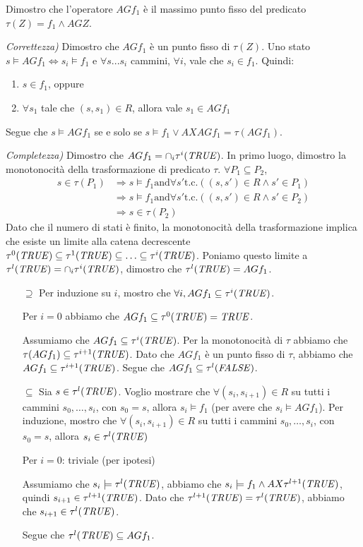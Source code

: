 \documentclass[12pt]{article}
\newcommand{\T}{\ensuremath{\textrm{\emph{TRUE}}}\xspace}
\newcommand{\F}{\ensuremath{\textrm{\emph{FALSE}}}\xspace}
\begin{document}
Dimostro che l'operatore $AG f_1$ è il massimo punto fisso del predicato $\tau(Z)=f_1 \land AGZ$.

\medskip

\textit{Correttezza)} Dimostro che $AG f_1$ è un punto fisso di $\tau(Z)$.
Uno stato $s \models AG f_1 \Leftrightarrow s_i \models f_1$ e $\forall s...s_i$ cammini, $\forall i$, vale che $s_i \in f_1$. Quindi:
\begin{enumerate}[noitemsep]
\item $s \in f_1$, oppure
\item $\forall s_1$ tale che $(s,s_1) \in R$, allora vale $s_1 \in AG f_1$
\end{enumerate}
Segue che $s \models AG f_1$ se e solo se $s \models f_1 \lor AXAG f_1 = \tau(AG f_1)$.

\medskip

\textit{Completezza)} Dimostro che $AG f_1 = \cap_i \tau^i(\textrm{\T})$.
In primo luogo, dimostro la monotonocità della trasformazione di predicato $\tau$. $\forall P_1 \subseteq P_2$,
\begin{align*}
s\in \tau(P_1) &\Rightarrow s \models f_1 \textrm{and} \forall s' \textrm{t.c.} ((s,s') \in R \land s' \in P_1)\\
               &\Rightarrow s \models f_1 \textrm{and} \forall s' \textrm{t.c.} ((s,s') \in R \land s' \in P_2)\\
			   &\Rightarrow s\in \tau(P_2)
\end{align*}
Dato che il numero di stati è finito, la monotonocità della trasformazione implica che esiste un limite alla catena decrescente $\tau^0(\T) \subseteq \tau^1(\T) \subseteq \ldots \subseteq \tau^i(\T)$.
Poniamo questo limite a $\tau^l(\T)=\cap_i \tau^i(\T)$, dimostro che $\tau^l(\T)=AG f_1$.
\begin{itemize}
\item[$\supseteq$] Per induzione su $i$, mostro che $\forall i,AG f_1 \subseteq \tau^i(\T)$.

	Per $i=0$ abbiamo che $AG f_1 \subseteq \tau^0(\T) = \T$.
	
	Assumiamo che $AG f_1 \subseteq \tau^i(\T)$. Per la monotonocità di $\tau$ abbiamo che $\tau(AG f_1) \subseteq \tau^{i+1}(\T)$. Dato che $AG f_1$ è un punto fisso di $\tau$, abbiamo che $AG f_1 \subseteq \tau^{i+1}(\T)$. Segue che $AG f_1 \subseteq \tau^l(\F)$.
\item[$\subseteq$] Sia $s \in \tau^l(\T)$. Voglio mostrare che $\forall (s_i,s_{i+1}) \in R$ su tutti i cammini $s_0, \ldots, s_i$, con $s_0 = s$, allora $s_i \models f_1$ (per avere che $s_i \models AG f_1$). 
	Per induzione, mostro che $\forall (s_i,s_{i+1}) \in R$ su tutti i cammini $s_0, \ldots, s_i$, con $s_0 = s$, allora $s_i \in \tau^l(\T)$

	Per $i=0$: triviale (per ipotesi)
	
	Assumiamo che $s_i \models \tau^l(\T)$, abbiamo che $s_i \models f_1 \land AX\tau^{l+1}(\T)$, quindi $s_{i+1} \in \tau^{l+1}(\T)$. Dato che $\tau^{l+1}(\T)=\tau^l(\T)$, abbiamo che $s_{i+1} \in \tau^l(\T)$.
	
	Segue che $\tau^l(\T) \subseteq AG f_1 $.
\end{itemize}
\end{document}
